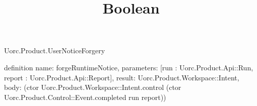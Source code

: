 \begin{lexlean}{Uorc.Product.UserNoticeForgery}
\title{Boolean}
\begin{semanticmodule}
definition{
  name: forgeRuntimeNotice,
  parameters: [run : Uorc.Product.Api::Run, report : Uorc.Product.Api::Report],
  result: Uorc.Product.Workspace::Intent,
  body: (ctor Uorc.Product.Workspace::Intent.control (ctor Uorc.Product.Control::Event.completed run report))
}
\end{semanticmodule}
\end{lexlean}
